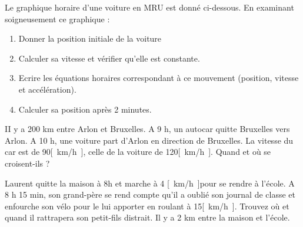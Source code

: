 \begin{exercise}
    Le graphique horaire d'une voiture en MRU est donné ci-dessous. En examinant soigneusement ce graphique :
    \begin{enumerate}[label=\alph*)]
        \item Donner la position initiale de la voiture
        \item Calculer sa vitesse et vérifier qu'elle est constante.
        \item Ecrire les équations horaires correspondant à ce mouvement (position, vitesse et accélération).
        \item Calculer sa position après 2 minutes.
    \end{enumerate}
\end{exercise}
\begin{solution}
\end{solution}

\begin{exercise}
    II y a 200 km entre Arlon et Bruxelles. A 9 h, un autocar quitte Bruxelles vers Arlon. A 10 h, une voiture  part d'Arlon en direction de Bruxelles. La vitesse du car est de 90\unit{[km/h]}, celle de la voiture de 120\unit{[km/h]}. Quand et où se croisent-ils ?
\end{exercise}
\begin{solution}
\end{solution}

\begin{exercise}
    Laurent quitte la maison à 8h et marche à 4 \unit{[km/h]}pour se rendre à l'école. A 8 h 15 min, son grand-père se rend compte qu'il a oublié son journal de classe et enfourche son vélo pour le lui apporter en roulant à 15\unit{[km/h]}. Trouvez où et quand il rattrapera son petit-fils distrait. Il y a 2 km entre la maison et l'école.
\end{exercise}
\begin{solution}
\end{solution}

